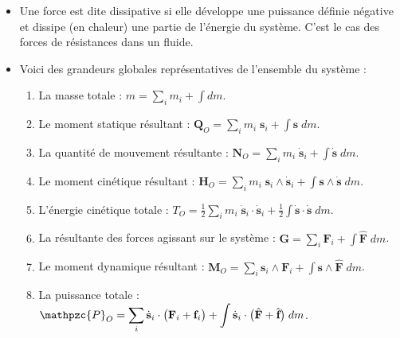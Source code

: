 \documentclass[a4paper]{article}
\begin{document}
\begin{itemize}
\item Une force est dite dissipative si elle développe une puissance définie négative et dissipe (en chaleur) une partie de l'énergie du système. C'est le cas des forces de résistances dans un fluide.





\item Voici des grandeurs globales représentatives de l'ensemble du système : 
\begin{enumerate}
\item La masse totale : $\displaystyle m = \sum_i m_i + \int d m $.
\item Le moment statique résultant : $\displaystyle \textbf{Q}_O = \sum_i m_i \; \textbf{s}_i + \int \textbf{s} \; d m $.
\item La quantité de mouvement résultante : $\displaystyle \textbf{N}_O = \sum_i m_i \; \dot{\textbf{s}}_i + \int \dot{\textbf{s}} \; d m $.
\item Le moment cinétique résultant : $\displaystyle \textbf{H}_O = \sum_i m_i \; \textbf{s}_i \wedge \dot{\textbf{s}}_i + \int \textbf{s} \wedge \dot{\textbf{s}} \; d m $.
\item L'énergie cinétique totale : $\displaystyle T_O = \frac{1}{2} \sum_i m_i \; \dot{\textbf{s}}_i \cdot \dot{\textbf{s}}_i + \frac{1}{2} \int \dot{\textbf{s}} \cdot \dot{\textbf{s}} \; d m $.
\item La résultante des forces agissant sur le système : $\displaystyle \textbf{G} = \sum_i \textbf{F}_i + \int \hat{\textbf{F}} \; d m $.
\item Le moment dynamique résultant : $\displaystyle \textbf{M}_O = \sum_i \textbf{s}_i \wedge \textbf{F}_i + \int \textbf{s} \wedge \hat{\textbf{F}} \; d m $.
\item La puissance totale : $\displaystyle \mathpzc{P}_O = \sum_i \dot{\textbf{s}}_i \cdot \big( \textbf{F}_i + \textbf{f}_i \big) + \int \dot{\textbf{s}}_i \cdot \big( \hat{\textbf{F}} + \hat{\textbf{f}} \big) \; d m $.
\end{enumerate}






\end{itemize}
\end{document}
